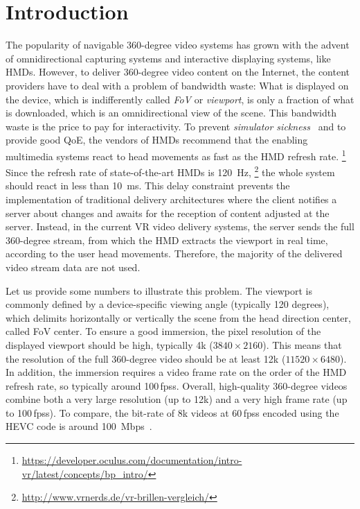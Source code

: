 \section{Introduction}
\label{sec:introduction}


The popularity of navigable 360-degree video systems has grown with
the advent of omnidirectional capturing systems
and interactive displaying systems, like \acp{HMD}. However, to
deliver 360-degree video content on the Internet, the content
providers have to deal with a problem of bandwidth waste: What is
displayed on the device, which is indifferently called
\textit{\ac{FoV}} or \textit{viewport}, is only a fraction of what is
downloaded, which is an omnidirectional view of the scene.
This bandwidth waste is the price to pay for interactivity. To prevent
\emph{simulator sickness}~\cite{moss2011characteristics} and to
provide good \ac{QoE}, the vendors of \acp{HMD} recommend that the
enabling multimedia systems react to head movements as fast as the
\ac{HMD} refresh rate.%
\footnote{\url{https://developer.oculus.com/documentation/intro-vr/latest/concepts/bp_intro/}}
Since the refresh rate of state-of-the-art \acp{HMD} is \SI{120}{Hz},%
\footnote{\url{http://www.vrnerds.de/vr-brillen-vergleich/}} the whole
system should react in less than \SI{10}{ms}. This delay constraint
prevents the implementation of traditional delivery architectures
where the client notifies a server about changes and awaits for the
reception of content adjusted at the server. Instead, in the current
\ac{VR} video delivery systems, the server sends the full 360-degree
stream, from which the \ac{HMD} extracts the viewport in real time,
according to the user head movements. Therefore, the majority of the
delivered video stream data are not used.

Let us provide some numbers to illustrate this problem. The viewport
is commonly defined by a device-specific viewing angle (typically 120
degrees), which delimits horizontally or vertically the scene from the
head direction center, called \ac{FoV} center. To ensure a good
immersion, the pixel resolution of the displayed viewport should be
high, typically 4k ($3840\times2160$). This means that the resolution
of the full 360-degree video should be at least 12k
($11520\times6480$). In addition, the immersion requires a video frame
rate on the order of the HMD refresh rate, so typically around
100\,\acp{fps}. Overall, high-quality 360-degree videos combine both a
very large resolution (up to 12k) and a very high frame rate (up to
100\,\acp{fps}). To compare, the bit-rate of 8k videos at
60\,\acp{fps} encoded using the \ac{HEVC} code is around
\SI{100}{Mbps}~\cite{7398367}.

